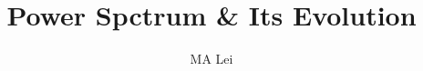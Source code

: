 \documentclass{article}
\begin{document}
\title{Power Spctrum \& Its Evolution}
\author{MA Lei}
\maketitle


























\end{document}

